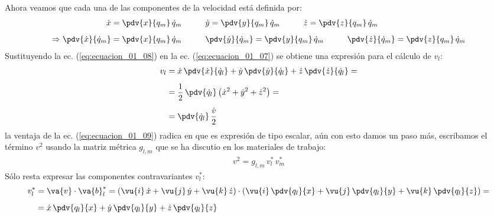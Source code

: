 Ahora veamos que cada una de las componentes de la velocidad está definida por:
\begin{align}
\begin{aligned}[b]
\dot{x} &= \pdv{x}{q_{m}} \, \dot{q}_{m} \hspace{1cm} \dot{y} = \pdv{y}{q_{m}} \, \dot{q}_{m} \hspace{1cm} \dot{z} = \pdv{z}{q_{m}} \, \dot{q}_{m} \\[0.5em]
\Rightarrow \pdv{\dot{x}}{\dot{q}_{m}} &= \pdv{x}{q_{m}} \, \dot{q}_{m} \hspace{1cm} \pdv{\dot{y}}{\dot{q}_{m}} = \pdv{y}{q_{m}} \, \dot{q}_{m} \hspace{1cm} \pdv{\dot{z}}{\dot{q}_{m}} = \pdv{z}{q_{m}} \, \dot{q}_{m}
\end{aligned}
\label{eq:ecuacion_01_08}
\end{align}
Sustituyendo la ec. (\ref{eq:ecuacion_01_08}) en la ec. (\ref{eq:ecuacion_01_07}) se obtiene una expresión para el cálculo de $v_{l}$:
\begin{align}
\begin{aligned}[b]
v_{l} &= \dot{x} \, \pdv{\dot{x}}{\dot{q}_{l}} + \dot{y} \, \pdv{\dot{y}}{\dot{q}_{l}} + \dot{z} \, \pdv{\dot{z}}{\dot{q}_{l}} = \\[0.5em]
&= \dfrac{1}{2} \, \pdv{\dot{q}_{l}} \left( \dot{x}^{2} + \dot{y}^{2} + \dot{z}^{2} \right) = \\[0.5em]
&= \pdv{\dot{q}_{l}} \, \dfrac{\dot{v}}{2}
\end{aligned}
\label{eq:ecuacion_01_09}
\end{align}
la ventaja de la ec. (\ref{eq:ecuacion_01_09}) radica en que es expresión de tipo escalar, aún con esto damos un paso más, escribamos el término $v^{2}$ usando la matriz métrica $g_{l,m}$ que se ha discutio en los materiales de trabajo:
\begin{align}
v^{2} = g_{l,m} \, v_{l}^{*} \, v_{m}^{*}
\label{eq:ecuacion_01_10}
\end{align}
Sólo resta expresar las componentes contravariantes $v_{l}^{*}$:
\begin{align}
\begin{aligned}[b]
v_{l}^{*} &= \va{v} \cdot \va{b}_{l}^{*} = (\vu{i} \, \dot{x} + \vu{j} \, \dot{y} + \vu{k} \, \dot{z}) \cdot \left( \vu{i} \, \pdv{q_{l}}{x} + \vu{j} \, \pdv{q_{l}}{y} + \vu{k} \, \pdv{q_{l}}{z} \right) = \\[0.5em]
&= \dot{x} \, \pdv{q_{l}}{x} + \dot{y} \, \pdv{q_{l}}{y} + \dot{z} \, \pdv{q_{l}}{z}
\end{aligned}
\label{eq:ecuacion_01_11}
\end{align}
